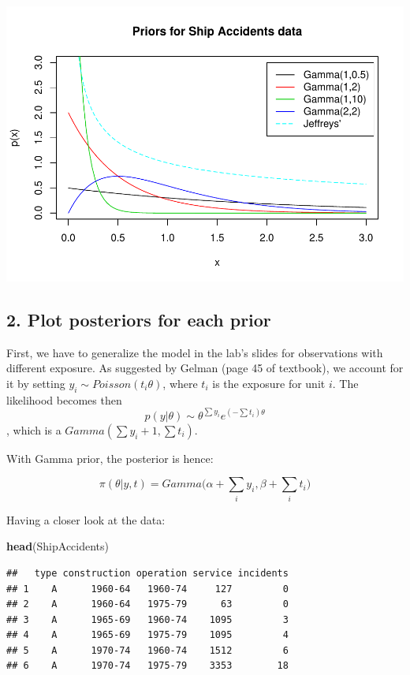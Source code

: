 \documentclass[]{article}
\newenvironment{Shaded}{\begin{snugshade}}{\end{snugshade}}
\newcommand{\KeywordTok}[1]{\textcolor[rgb]{0.13,0.29,0.53}{\textbf{#1}}}
\newcommand{\NormalTok}[1]{#1}
\begin{document}
\includegraphics{ex01_files/figure-latex/unnamed-chunk-8-1.pdf}

\subsection{2. Plot posteriors for each
prior}\label{plot-posteriors-for-each-prior}

First, we have to generalize the model in the lab's slides for
observations with different exposure. As suggested by Gelman (page 45 of
textbook), we account for it by setting \(y_i\sim Poisson(t_i\theta)\),
where \(t_i\) is the exposure for unit \(i\). The likelihood becomes
then \[
p(y|\theta) \sim \theta^{\sum y_i}e^{(-\sum t_i)\theta} 
\] , which is a \(Gamma(\sum y_i +1, \sum t_i)\).

With Gamma prior, the posterior is hence:

\[
\pi(\theta|y,t) = Gamma\bigg(\alpha+\sum_i y_i, \beta + \sum_i t_i\bigg)
\]

Having a closer look at the data:

\begin{Shaded}
\begin{Highlighting}[]
\KeywordTok{head}\NormalTok{(ShipAccidents)}
\end{Highlighting}
\end{Shaded}

\begin{verbatim}
##   type construction operation service incidents
## 1    A      1960-64   1960-74     127         0
## 2    A      1960-64   1975-79      63         0
## 3    A      1965-69   1960-74    1095         3
## 4    A      1965-69   1975-79    1095         4
## 5    A      1970-74   1960-74    1512         6
## 6    A      1970-74   1975-79    3353        18
\end{verbatim}
\end{document}
